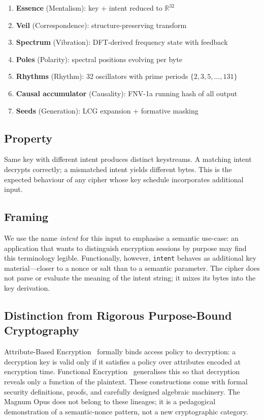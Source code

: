 \documentclass[sigplan,anonymous=false]{acmart}
\begin{document}
\begin{enumerate}[nosep]
  \item \textbf{Essence} (Mentalism): key + intent reduced to $\mathbb{R}^{32}$
  \item \textbf{Veil} (Correspondence): structure-preserving transform
  \item \textbf{Spectrum} (Vibration): DFT-derived frequency state with feedback
  \item \textbf{Poles} (Polarity): spectral positions evolving per byte
  \item \textbf{Rhythms} (Rhythm): 32 oscillators with prime periods $\{2, 3, 5, \ldots, 131\}$
  \item \textbf{Causal accumulator} (Causality): FNV-1a running hash of all output
  \item \textbf{Seeds} (Generation): LCG expansion + formative masking
\end{enumerate}

\subsection{Property}

Same key with different intent produces distinct keystreams. A matching intent decrypts correctly; a mismatched intent yields different bytes. This is the expected behaviour of any cipher whose key schedule incorporates additional input.

\subsection{Framing}

We use the name \emph{intent} for this input to emphasise a semantic use-case: an application that wants to distinguish encryption sessions by purpose may find this terminology legible. Functionally, however, \texttt{intent} behaves as additional key material---closer to a nonce or salt than to a semantic parameter. The cipher does not parse or evaluate the meaning of the intent string; it mixes its bytes into the key derivation.

\subsection{Distinction from Rigorous Purpose-Bound Cryptography}

Attribute-Based Encryption~\cite{abe} formally binds access policy to decryption: a decryption key is valid only if it satisfies a policy over attributes encoded at encryption time. Functional Encryption~\cite{fe} generalises this so that decryption reveals only a function of the plaintext. These constructions come with formal security definitions, proofs, and carefully designed algebraic machinery. The Magnum Opus does not belong to these lineages; it is a pedagogical demonstration of a semantic-nonce pattern, not a new cryptographic category.
\end{document}
